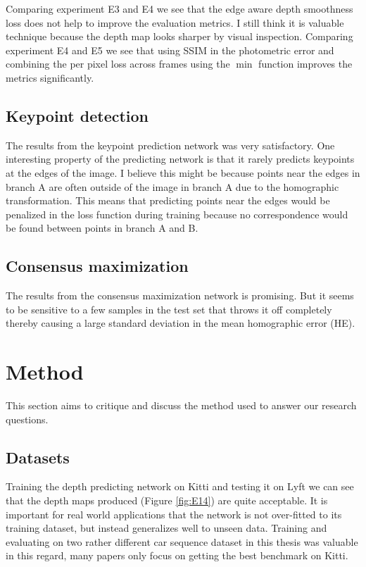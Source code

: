 Comparing experiment E3 and E4 we see that the edge aware depth smoothness loss does not help to improve the evaluation metrics. I still think it is valuable technique because the depth map looks sharper by visual inspection. Comparing experiment E4 and E5 we see that using SSIM in the photometric error and combining the per pixel loss across frames using the $\min$ function improves the metrics significantly.

\subsection{Keypoint detection}

The results from the keypoint prediction network was very satisfactory. One interesting property of the predicting network is that it rarely predicts keypoints at the edges of the image. I believe this might be because points near the edges in branch A are often outside of the image in branch A due to the homographic transformation. This means that predicting points near the edges would be penalized in the loss function during training because no correspondence would be found between points in branch A and B.

\subsection{Consensus maximization}

The results from the consensus maximization network is promising. But it seems to be sensitive to a few samples in the test set that throws it off completely thereby causing a large standard deviation in the mean homographic error (HE).

\section{Method}

This section aims to critique and discuss the method used to answer our research questions.

\subsection{Datasets}

Training the depth predicting network on Kitti and testing it on Lyft we can see that the depth maps produced (Figure \ref{fig:E14}) are quite acceptable. It is important for real world applications that the network is not over-fitted to its training dataset, but instead generalizes well to unseen data. Training and evaluating on two rather different car sequence dataset in this thesis was valuable in this regard, many papers only focus on getting the best benchmark on Kitti.

